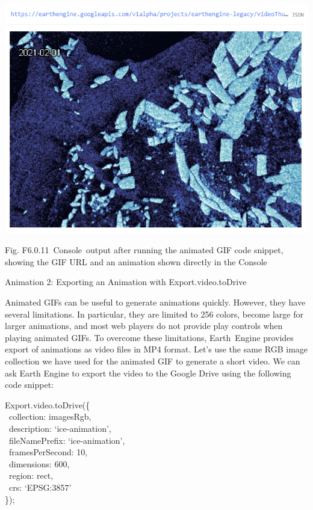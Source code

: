 \documentclass[
  letterpaper,
  DIV=11,
  numbers=noendperiod]{scrreprt}
\begin{document}
\includegraphics{./F6/image56.png}

Fig. F6.0.11~Console~output after running the animated GIF code snippet,
showing the GIF URL and an animation shown directly in the Console

Animation 2: Exporting an Animation with Export.video.toDrive

Animated GIFs can be useful to generate animations quickly. However,
they have several limitations. In particular, they are limited to 256
colors, become large for larger animations, and most web players do not
provide play controls when playing animated GIFs. To overcome these
limitations, Earth~Engine provides export of animations as video files
in MP4 format. Let's use the same RGB image collection we have used for
the animated GIF to generate a short video. We can ask Earth Engine to
export the video to the Google Drive using the following code snippet:

Export.video.toDrive(\{\\
\hspace*{0.333em} ~collection: imagesRgb,\\
\hspace*{0.333em} ~description: `ice-animation',\\
\hspace*{0.333em} ~fileNamePrefix: `ice-animation',\\
\hspace*{0.333em} ~framesPerSecond: 10,\\
\hspace*{0.333em} ~dimensions: 600,\\
\hspace*{0.333em} ~region: rect,\\
\hspace*{0.333em} ~crs: `EPSG:3857'\\
\});
\end{document}
